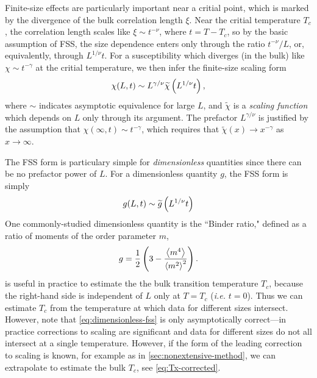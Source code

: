 Finite-size effects are particularly important near a critial point, which is
marked by the divergence of the bulk correlation length $\xi$. Near the critial
temperature $T_c$, the correlation length scales like $\xi \sim t^{-\nu}$,
where $t=T-T_c$, so by the basic assumption of FSS, the size dependence enters
only through the ratio $t^{-\nu}/L$, or, equivalently, through $L^{1/\nu} t$.
For a susceptibility which diverges (in the bulk) like $\chi \sim t^{-\gamma}$
at the critial temperature, we then infer the finite-size scaling form
\begin{equation}
  \chi(L,t) \sim L^{\gamma/\nu} \widetilde{\chi}\left(L^{1/\nu} t\right),
  \label{eq:standard-fss-susc}
\end{equation}
where $\sim$ indicates asymptotic equivalence for large $L$, and
$\widetilde{\chi}$ is a \emph{scaling function} which depends on $L$ only
through its argument. The prefactor $L^{\gamma/\nu}$ is justified by the
assumption that $\chi(\infty,t) \sim t^{-\gamma}$, which requires that
$\widetilde{\chi}(x) \to x^{-\gamma}$ as $x \to \infty$.

The FSS form is particulary simple for \emph{dimensionless} quantities since
there can be no prefactor power of $L$. For a dimensionless quantity $g$, the
FSS form is simply
\begin{equation}
  g(L,t) \sim \widetilde{g}\left(L^{1/\nu} t\right)
  \label{eq:dimensionless-fss}
\end{equation}
One commonly-studied dimensionless quantity is the ``Binder ratio,"
defined as a ratio of moments of the order parameter $m$,
\begin{equation}
  g = \frac{1}{2}\left(3 - \frac{\left< m^4 \right>}{\left< m^2 \right>^2}\right).
  \label{eq:def-binder}
\end{equation}
 is useful in practice to estimate the the bulk
transition temperature $T_c$, because the right-hand side is independent of $L$
only at $T=T_c$ (\emph{i.e.} $t=0$). Thus we can estimate $T_c$ from the
temperature at which data for different sizes intersect. However, note that
\cref{eq:dimensionless-fss} is only asymptotically correct---in practice
corrections to scaling are significant and data for different sizes do not all
intersect at a single temperature. However, if the form of the leading
correction to scaling is known, for example as in
\cref{sec:nonextensive-method}, we can extrapolate to estimate the bulk $T_c$,
see \cref{eq:Tx-corrected}.

